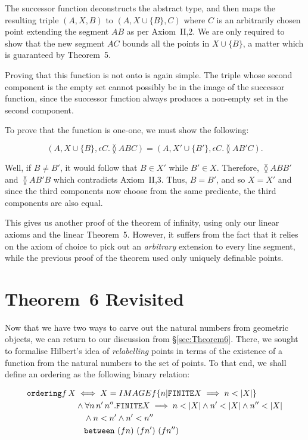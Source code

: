 The successor function deconstructs the abstract type, and then maps the resulting triple $(A,X,B)$ to $(A,X \cup \{B\}, C)$ where $C$ is an arbitrarily chosen point extending the segment $AB$ as per Axiom~II,2. We are only required to show that the new segment $AC$ bounds all the points in $X \cup \{B\}$, a matter which is guaranteed by Theorem~5.

Proving that this function is not onto is again simple. The triple whose second component is the empty set cannot possibly be in the image of the successor function, since the successor function always produces a non-empty set in the second component.

To prove that the function is one-one, we must show the following:

\begin{displaymath}
(A,X \cup \{B\}, \epsilon C. \between{A}{B}{C}) = (A,X' \cup \{B'\}, \epsilon C. \between{A}{B'}{C}).
\end{displaymath}

Well, if $B\neq B'$, it would follow that $B\in X'$ while $B'\in X$. Therefore, $\between{A}{B}{B'}$ and $\between{A}{B'}{B}$ which contradicts Axiom~II,3. Thus, \mbox{$B = B'$}, and so $X = X'$ and since the third components now choose from the same predicate, the third components are also equal.

This gives us another proof of the theorem of infinity, using only our linear axioms and the linear Theorem~5. However, it suffers from the fact that it relies on the axiom of choice to pick out an \emph{arbitrary} extension to every line segment, while the previous proof of the theorem used only uniquely definable points.

\section{Theorem~6 Revisited}
Now that we have two ways to carve out the natural numbers from geometric objects, we can return to our discussion from \S\ref{sec:Theorem6}. There, we sought to formalise Hilbert's idea of \emph{relabelling} points in terms of the existence of a function from the natural numbers to the set of points. To that end, we shall define an ordering as the following binary relation:

\begin{align*}
\texttt{ordering} f\,X &\iff X = IMAGE f \{n \vert \texttt{FINITE} X \implies n < \left|X\right|\}\\
               &\wedge \forall n\,n'\,n''. \texttt{FINITE} X \implies n < \left|X\right| \wedge n' < \left|X\right| \wedge n'' < \left|X\right|\\
               &\quad\wedge n < n' \wedge n' < n'' \\
               &\quad\texttt{between}\ (f n)\ (f n')\ (f n'')
\end{align*}

